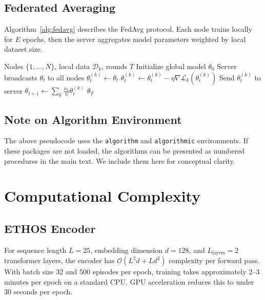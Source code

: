 \subsection{Federated Averaging}

Algorithm~\ref{alg:fedavg} describes the FedAvg protocol. Each node trains locally for $E$ epochs, then the server aggregates model parameters weighted by local dataset size.

\begin{algorithm}[htbp]
\caption{Federated Averaging (FedAvg)}
\label{alg:fedavg}
\small
\begin{algorithmic}[1]
\Require Nodes $\{1,\ldots,N\}$, local data $\mathcal{D}_k$, rounds $T$
\State Initialize global model $\theta_0$
\State Server broadcasts $\theta_t$ to all nodes
\State $\theta_t^{(k)} \gets \theta_t$
\State $\theta_t^{(k)} \gets \theta_t^{(k)} - \eta \nabla \mathcal{L}_k(\theta_t^{(k)})$
\EndFor
\State Send $\theta_t^{(k)}$ to server
\EndFor
\State $\theta_{t+1} \gets \sum_k \frac{n_k}{n} \theta_t^{(k)}$
\EndFor
\State \Return $\theta_T$
\end{algorithmic}
\end{algorithm}

\subsection{Note on Algorithm Environment}

The above pseudocode uses the \texttt{algorithm} and \texttt{algorithmic} environments. If these packages are not loaded, the algorithms can be presented as numbered procedures in the main text. We include them here for conceptual clarity.

\section{Computational Complexity}

\subsection{ETHOS Encoder}

For sequence length $L=25$, embedding dimension $d=128$, and $L_{\text{layers}}=2$ transformer layers, the encoder has $\mathcal{O}(L^2 d + L d^2)$ complexity per forward pass. With batch size 32 and 500 episodes per epoch, training takes approximately 2--3 minutes per epoch on a standard CPU. GPU acceleration reduces this to under 30 seconds per epoch.

